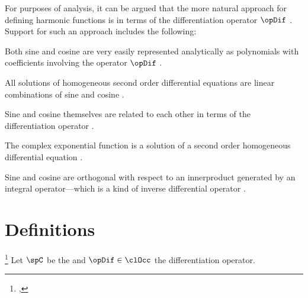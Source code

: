 For purposes of analysis, it can be argued that the more natural approach
for defining harmonic functions is in terms of the 
differentiation operator $\opDif$ .
Support for such an approach includes the following:
\begin{liste}
  \item Both sine and cosine are very easily 
        represented analytically as polynomials with coefficients involving
        the operator $\opDif$ .
  \item All solutions of homogeneous second order differential equations
        are linear combinations of sine and cosine .
  \item Sine and cosine themselves are related to each other in terms of 
        the differentiation operator .
  \item The complex exponential function is a solution of a second order
        homogeneous differential equation .
  \item Sine and cosine are orthogonal with respect to an innerproduct
        generated by an integral operator---which is a kind of inverse 
        differential operator .
\end{liste}


\section{Definitions}
\begin{definition}
\footnote{
  ,
  }
\label{def:cos}
Let $\spC$ be the 
and $\opDif\in\clOcc$ the differentiation operator.
\end{definition}


